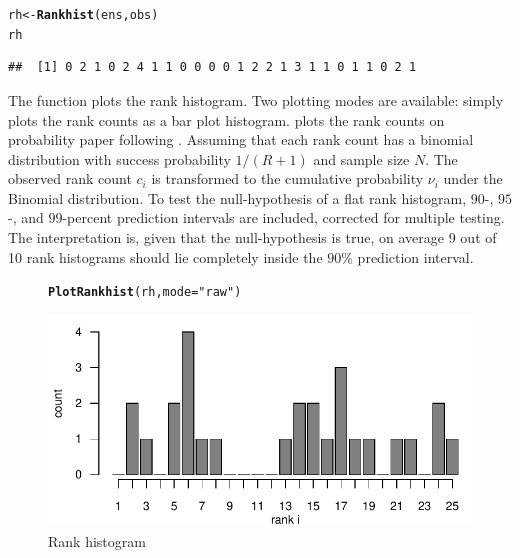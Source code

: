 \documentclass[article]{jss}\usepackage{graphicx, color}
\makeatletter
\def\maxwidth{ %
  \ifdim\Gin@nat@width>\linewidth
    \linewidth
  \else
    \Gin@nat@width
  \fi
}
\newcommand{\hlfunctioncall}[1]{\textcolor[rgb]{0,0.501960784313725,0.752941176470588}{\textbf{#1}}}%
\newcommand{\hlstring}[1]{\textcolor[rgb]{0.650980392156863,0.52156862745098,0}{#1}}%
\newenvironment{kframe}{%
 \def\at@end@of@kframe{}%
 \ifinner\ifhmode%
  \def\at@end@of@kframe{\end{minipage}}%
  \begin{minipage}{\columnwidth}%
 \fi\fi%
 \def\FrameCommand##1{\hskip\@totalleftmargin \hskip-\fboxsep
 \colorbox{shadecolor}{##1}\hskip-\fboxsep
     \hskip-\linewidth \hskip-\@totalleftmargin \hskip\columnwidth}%
 \MakeFramed {\advance\hsize-\width
   \@totalleftmargin\z@ \linewidth\hsize
   \@setminipage}}%
 {\par\unskip\endMakeFramed%
 \at@end@of@kframe}
\newenvironment{knitrout}{}{} %
\makeatother
\begin{document}
\begin{knitrout}
\color{fgcolor}\begin{kframe}
\begin{alltt}
rh <- \hlfunctioncall{Rankhist}(ens, obs)
rh
\end{alltt}
\begin{verbatim}
##  [1] 0 2 1 0 2 4 1 1 0 0 0 0 1 2 2 1 3 1 1 0 1 1 0 2 1
\end{verbatim}
\end{kframe}
\end{knitrout}




The function  plots the rank histogram.
Two plotting modes are available:
 simply plots the rank counts as a bar plot histogram.
 plots the rank counts on probability paper following \citet{broecker2008reliability}. 
Assuming that each rank count has a binomial distribution with success probability $1/(R+1)$ and sample size $N$.
The observed rank count $c_i$ is transformed to the cumulative probability $\nu_i$ under the Binomial distribution.
To test the null-hypothesis of a flat rank histogram, $90$-, $95$-, and $99$-percent prediction intervals are included, corrected for multiple testing.
The interpretation is, given that the null-hypothesis is true, on average 9 out of 10 rank histograms should lie completely inside the $90\%$ prediction interval.



\begin{figure}
\begin{center}
%
\begin{knitrout}
\color{fgcolor}\begin{kframe}
\begin{alltt}
\hlfunctioncall{PlotRankhist}(rh, mode=\hlstring{"raw"})
\end{alltt}
\end{kframe}
\includegraphics[width=\maxwidth]{figure/rank-hist} 

\end{knitrout}

%
\end{center}
\caption{Rank histogram}
\label{fig:rank-hist}
\end{figure}
\end{document}
